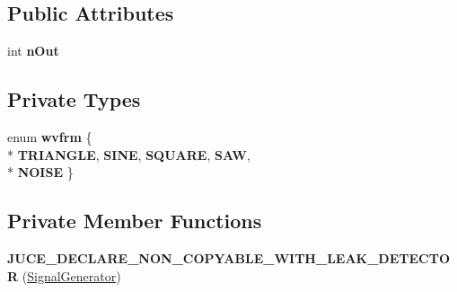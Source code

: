 \subsection*{Public Attributes}
\begin{DoxyCompactItemize}
\item 
\hypertarget{classSignalGenerator_a62af0523f11ba4ad7ca44e9c8f42cf60}{int {\bfseries n\-Out}}\label{classSignalGenerator_a62af0523f11ba4ad7ca44e9c8f42cf60}

\end{DoxyCompactItemize}
\subsection*{Private Types}
\begin{DoxyCompactItemize}
\item 
enum {\bfseries wvfrm} \{ \\*
{\bfseries T\-R\-I\-A\-N\-G\-L\-E}, 
{\bfseries S\-I\-N\-E}, 
{\bfseries S\-Q\-U\-A\-R\-E}, 
{\bfseries S\-A\-W}, 
\\*
{\bfseries N\-O\-I\-S\-E}
 \}
\end{DoxyCompactItemize}
\subsection*{Private Member Functions}
\begin{DoxyCompactItemize}
\item 
\hypertarget{classSignalGenerator_a59740d579ce5c8517eb58bf9026a6dd3}{{\bfseries J\-U\-C\-E\-\_\-\-D\-E\-C\-L\-A\-R\-E\-\_\-\-N\-O\-N\-\_\-\-C\-O\-P\-Y\-A\-B\-L\-E\-\_\-\-W\-I\-T\-H\-\_\-\-L\-E\-A\-K\-\_\-\-D\-E\-T\-E\-C\-T\-O\-R} (\hyperlink{classSignalGenerator}{Signal\-Generator})}\label{classSignalGenerator_a59740d579ce5c8517eb58bf9026a6dd3}

\end{DoxyCompactItemize}
